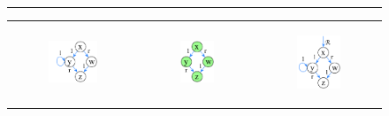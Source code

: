 \begin{figure}
\hrule
\begin{tabular}{c c c}
	\begin{subfigure}[b]{0.3\columnwidth}
      \centering	
      \includegraphics[scale=0.3]{sections/FurtherExamples/Images/graph.pdf}
    \caption{}
    \label{subfig:graph}
    \end{subfigure}
    &
    \begin{subfigure}[b]	{0.2\columnwidth}		
      \centering	
      \includegraphics[scale=0.3]{sections/FurtherExamples/Images/tree.pdf}
    \caption{}
    \label{subfig:tree}
    \end{subfigure}
    &
    \begin{subfigure}[b]{0.3\columnwidth}
      \centering	
      \includegraphics[scale=0.3]{sections/FurtherExamples/Images/graphWithRootEdge.pdf}

\end{subfigure}
\end{tabular}
\end{figure}

